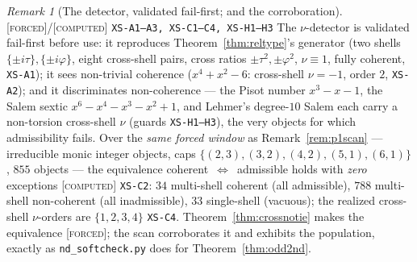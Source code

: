 \documentclass[11pt]{article}
\newcommand{\tagF}{\textcolor{cF}{\textsc{[forced]}}}
\newcommand{\tagC}{\textcolor{cC}{\textsc{[computed]}}}
\newcommand{\hx}[1]{\textcolor{cC}{\footnotesize\texttt{#1}}}
\newcommand{\gp}{\varphi}
\theoremstyle{plain}
\theoremstyle{definition}
\theoremstyle{remark}
\newtheorem{remark}[theorem]{Remark}
\begin{document}
\begin{remark}[The detector, validated fail-first; and the corroboration]\label{rem:crossscan}\tagF{}/\tagC{} \hx{XS-A1--A3, XS-C1--C4, XS-H1--H3}
The $\nu$-detector is validated fail-first before use: it reproduces
Theorem~\ref{thm:reltype}'s generator (two shells $\{\pm i\tau\},\{\pm i\gp\}$,
eight cross-shell pairs, cross ratios $\pm\tau^2,\pm\gp^2$, $\nu\equiv1$, fully
coherent, \hx{XS-A1}); it sees non-trivial coherence ($x^4+x^2-6$: cross-shell
$\nu=-1$, order $2$, \hx{XS-A2}); and it discriminates non-coherence --- the
Pisot number $x^3-x-1$, the Salem sextic $x^6-x^4-x^3-x^2+1$, and Lehmer's
degree-$10$ Salem each carry a non-torsion cross-shell $\nu$ (guards
\hx{XS-H1--H3}), the very objects for which admissibility fails. Over the
\emph{same forced window} as Remark~\ref{rem:p1scan} --- irreducible monic integer
objects, caps $\{(2,3),(3,2),(4,2),(5,1),(6,1)\}$, $855$ objects --- the
equivalence coherent~$\iff$~admissible holds with \emph{zero} exceptions \tagC{}
\hx{XS-C2}: $34$ multi-shell coherent (all admissible), $788$ multi-shell
non-coherent (all inadmissible), $33$ single-shell (vacuous); the realized
cross-shell $\nu$-orders are $\{1,2,3,4\}$ \hx{XS-C4}.
Theorem~\ref{thm:crossnotie} makes the equivalence \tagF{}; the scan corroborates
it and exhibits the population, exactly as \texttt{nd\_softcheck.py} does for
Theorem~\ref{thm:odd2nd}.
\end{remark}
\end{document}
